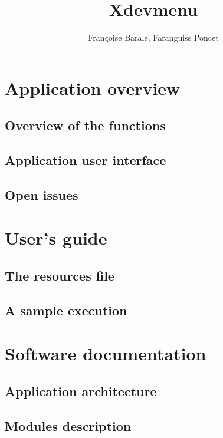 %
%
%
%
%
%
%
%
%
%



\title{Xdevmenu} 
\author{Fran\c{c}oise Barale, Faranguiss Poncet}
\titlepage
\begin{abstract}

\end{abstract}

\setcounter{page}{0}    
\newpage
\tableofcontents
\pagestyle{myheadings}
\setcounter{page}{0}    
\newpage

\newpage

\section{Application overview}
	
\subsection{Overview of the functions}

\newpage
\subsection{Application user interface}
	
\newpage
\subsection{Open issues}
	

\newpage
\section{User's guide}

\subsection{The resources file}	
	
\newpage
\subsection{A sample execution}
	

\newpage
\section{Software documentation}
	
\subsection{Application architecture}
	
\newpage
\subsection{Modules description}
	

\newpage
{}




